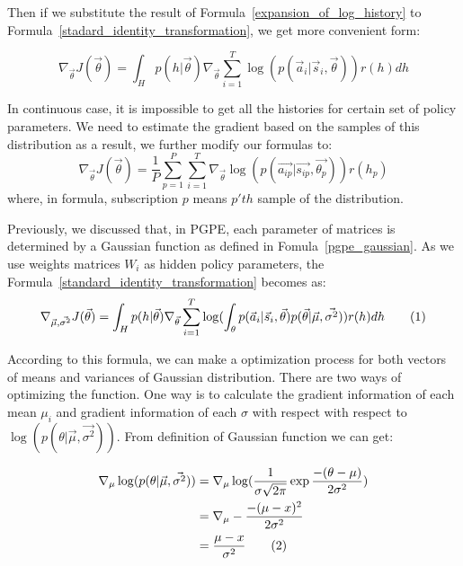 \documentclass[officiallayout]{tktla}
\newcommand\numberthis{\addtocounter{equation}{1}\tag{\theequation}}
\begin{document}
Then if we substitute the result of Formula~\ref{expansion_of_log_history} to Formula~\ref{stadard_identity_transformation}, we get more convenient form:


\begin{equation}
\nabla_{\vec{\theta}} J(\vec{\theta}) = \int_H p(h|\vec{\theta}) \nabla_{\vec{\theta}} \sum_{i=1}^T\log(p(\vec{a}_{i}|\vec{s}_{i}, \vec{\theta}))r(h)dh
\label{standard_identity_transformation}
\end{equation}

In continuous case, it is impossible to get all the histories for certain set of policy parameters. We need to estimate the gradient based on the samples of this distribution as a result, we further modify our formulas to:
\begin{equation}
\nabla_{\vec{\theta}} J(\vec{\theta}) = \frac{1}{P}\sum_{p=1}^P  \sum_{i=1}^T\nabla_{\vec{\theta}}\log(p(\vec{a_{ip}}|\vec{s_{ip}}, \vec{\theta_p}))r(h_p)
\label{pgpe_policy}
\end{equation}
where, in formula, subscription $p$ means $p'th$ sample of the distribution.

Previously, we discussed that, in PGPE, each parameter of matrices is determined by a Gaussian function as defined in Fomula~\ref{pgpe_gaussian}. As we use weights matrices $W_i$ as hidden policy parameters, the Formula~\ref{standard_identity_transformation} becomes as:
\begin{align*}
\nabla_{\vec{\mu}, \vec{\sigma^2}} J(\vec{\theta}) = \int_H p(h|\vec{\theta}) \nabla_{\vec{\theta}} \sum_{i=1}^T\log(\int_\theta p(\vec{a}_{i}|\vec{s}_{i}, \vec{\theta})p(\vec{\theta}|\vec{\mu},\vec{\sigma^2}))r(h)dh \numberthis \label{standard_identity_transformation_replaced_by_mean_sigma}
\end{align*}

According to this formula, we can make a optimization process for both vectors of means and variances of Gaussian distribution. There are two ways of optimizing the function. One way is to calculate the gradient information of each mean $\mu_i$ and gradient information of each $\sigma$ with respect with respect to $\log(p(\theta| \vec{\mu}, \vec{\sigma^2}))$. From definition of Gaussian function we can get:

\begin{align*}
\nabla_\mu \log(p(\theta| \vec{\mu}, \vec{\sigma^2})) &= \nabla_\mu \log(\frac{1}{\sigma\sqrt{2\pi}}\exp\frac{-(\theta - \mu)}{2\sigma^2}) \\
&= \nabla_\mu -\frac{-(\mu - x)^2}{2\sigma^2} \\
&= \frac{\mu-x}{\sigma^2}   \numberthis \label{gaussian_mean_gradient} 
\end{align*}
\end{document}
